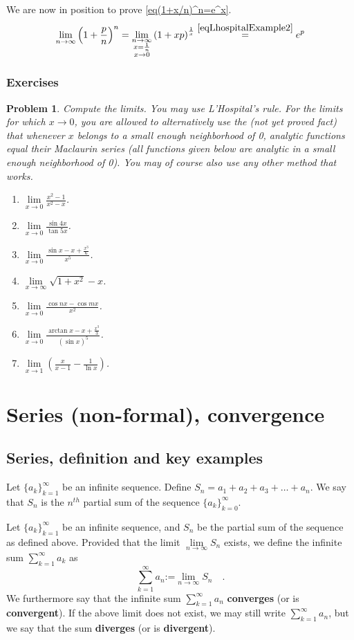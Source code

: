 \documentclass[12pt]{book}
\newcommand{\eqdef}{\textbf{:=}}
\newcommand{\importantFormula}[1]{\begin{equation} \boxed{#1} \end{equation}}
\newtheorem{problem}{Problem}[section]
\renewcommand{\emph}{\textbf}
\begin{document}
We are now in position to prove \eqref{eq(1+x/n)^n=e^x}.
\[
\lim\limits_{n\to \infty} \left(1+\frac{p}{n}\right)^n= \lim_{\substack{n\to \infty \\ x=\frac{1}{n}\\x\to 0}} \left(1+xp\right)^{\frac{1}{x}} \stackrel{\eqref{eqLhospitalExample2}}{=}e^p
\]
\subsubsection{Exercises}
\begin{problem}
Compute the limits. You may use L'Hospital's rule. For the limits for which $x\to 0$, you are allowed to alternatively use the (not yet proved fact) that whenever $x$ belongs to a small enough neighborhood of 0, analytic functions equal their Maclaurin series (all functions given below are analytic in a small enough neighborhood of 0). You may of course also use any other method that works.
\begin{enumerate}
\item $\lim\limits_{x\to 0} \frac{x^2-1}{x^2-x}$.
\item $\lim\limits_{x\to 0} \frac{\sin 4 x}{\tan 5x}$.
\item $\lim\limits_{x\to 0} \frac{\sin x - x +\frac{x^3}{6}}{x^5}$.
\item $\lim\limits_{x\to \infty} \sqrt{1+x^2} - x$.
\item $\lim\limits_{x\to 0} \frac{\cos n x - \cos mx }{x^2}$.
\item $\lim\limits_{x\to 0} \frac{\arctan x - x+ \frac{x^3}{3} }{(\sin x)^5}$.
\item $\lim\limits_{x\to 1}\left(\frac{x}{x-1}- \frac{1}{\ln x} \right)$.
\end{enumerate}
\end{problem}

\section{Series (non-formal), convergence}\label{secSeriesConvergence}
\subsection{Series, definition and key examples}
Let $\{a_k\}_{k=1}^\infty$ be an infinite sequence. Define $S_n= a_1+a_2+a_3+\dots+a_n$. We say that $S_n$ is the $n^{th}$ partial sum of the sequence $\{a_k\}_{k=0}^\infty$.

Let $\{a_k\}_{k=1}^\infty$ be an infinite sequence, and $S_n$ be the partial sum of the sequence as defined above. Provided that the limit $\lim\limits_{n\to\infty} S_n$ exists, we define the infinite sum $\sum\limits_{k=1}^\infty a_k $ as
\importantFormula{
\sum_{k=1}^{\infty}a_n\eqdef \lim\limits_{n\to \infty} S_n\quad .
}
We furthermore say that the infinite sum $\sum\limits_{k=1}^{\infty}a_n$ \emph{converges} (or is \emph{convergent}). If the above limit does not exist, we may still write $\sum\limits_{k=1}^{\infty}a_n$, but we say that the sum \emph{diverges} (or is \emph{divergent}).  
\end{document}
